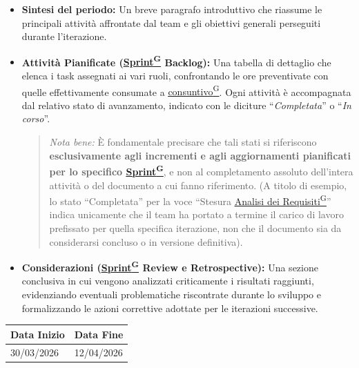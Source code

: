 \documentclass[a4paper,12pt]{article}
\newcounter{subsubsubsection}[subsubsection]
\providecommand{\glslink}[2]{\href{https://alittlebyte-19.github.io/Documentazione/glossario.html\#gls-#1}{\underline{#2}\textsuperscript{\scriptsize G}}}
\begin{document}
\begin{itemize}
    \item \textbf{Sintesi del periodo:} Un breve paragrafo introduttivo che riassume le principali attività affrontate dal team e gli obiettivi generali perseguiti durante l'iterazione.
    
    \item \textbf{Attività Pianificate (\glslink{sprint}{Sprint} Backlog):} Una tabella di dettaglio che elenca i task assegnati ai vari ruoli, confrontando le ore preventivate con quelle effettivamente consumate a \glslink{consuntivo}{consuntivo}. Ogni attività è accompagnata dal relativo stato di avanzamento, indicato con le diciture ``\textit{Completata}'' o ``\textit{In corso}''.
    \begin{quote}
        \textit{Nota bene:} È fondamentale precisare che tali stati si riferiscono \textbf{esclusivamente agli incrementi e agli aggiornamenti pianificati per lo specifico \glslink{sprint}{Sprint}}, e non al completamento assoluto dell'intera attività o del documento a cui fanno riferimento. (A titolo di esempio, lo stato ``Completata'' per la voce ``Stesura \glslink{analisi-dei-requisiti-adr}{Analisi dei Requisiti}'' indica unicamente che il team ha portato a termine il carico di lavoro prefissato per quella specifica iterazione, non che il documento sia da considerarsi concluso o in versione definitiva).
    \end{quote}
    
    \item \textbf{Considerazioni (\glslink{sprint}{Sprint} Review e Retrospective):} Una sezione conclusiva in cui vengono analizzati criticamente i risultati raggiunti, evidenziando eventuali problematiche riscontrate durante lo sviluppo e formalizzando le azioni correttive adottate per le iterazioni successive.
\end{itemize}


\label{sec:rtb_primoperiodo}
\begin{table}[H]
    \centering
    \renewcommand{\arraystretch}{1.5} %
    \begin{tabularx}{\textwidth}{|X|X|}
    \hline \rowcolor{Dandelion!50}
    \textbf{Data Inizio} & \textbf{Data Fine}\\
    \hline
    30/03/2026 & 12/04/2026\\
    \hline

    \end{tabularx}
\end{table}
\end{document}
